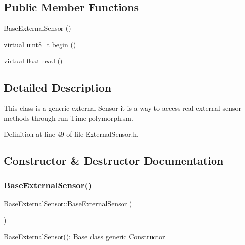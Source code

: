 \subsection*{Public Member Functions}
\begin{DoxyCompactItemize}
\item 
\hyperlink{class_base_external_sensor_a978d96a6563b646efb358c2790a9fc6f}{Base\+External\+Sensor} ()
\item 
virtual uint8\+\_\+t \hyperlink{class_base_external_sensor_a87d132803d4f4fdd4e66332809f0c9a0}{begin} ()
\item 
virtual float \hyperlink{class_base_external_sensor_a1564f16deacf57b51b9948ac29db4291}{read} ()
\end{DoxyCompactItemize}


\subsection{Detailed Description}
This class is a generic external Sensor it is a way to access real external sensor methods through run Time polymorphism. 

Definition at line 49 of file External\+Sensor.\+h.



\subsection{Constructor \& Destructor Documentation}
\mbox{\label{class_base_external_sensor_a978d96a6563b646efb358c2790a9fc6f}} 
\subsubsection{\texorpdfstring{Base\+External\+Sensor()}{BaseExternalSensor()}}
{\footnotesize\ttfamily Base\+External\+Sensor\+::\+Base\+External\+Sensor (\begin{DoxyParamCaption}{ }\end{DoxyParamCaption})\hspace{0.3cm}{\ttfamily [inline]}}

\hyperlink{class_base_external_sensor_a978d96a6563b646efb358c2790a9fc6f}{Base\+External\+Sensor()}\+: Base class generic Constructor 

